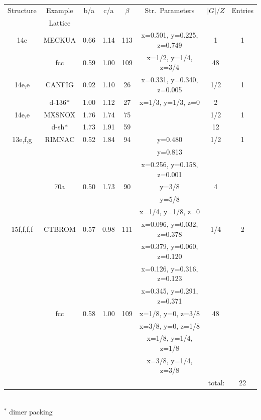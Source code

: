 \documentclass[preprint]{iucr}              %
\begin{document}
\begin{landscape}
\begin{table}
\begin{center}
\begin{tabular}{cccccccc}%
\cline{1-8}
Structure & Example & b/a & c/a & $\beta$ & Str.\ Parameters & $|G|/Z$ & Entries \\
          & Lattice \\
\cline{1-8}
14e     & MECKUA    & 0.66 & 1.14 & 113 & x=0.501, y=0.225, z=0.749 & 1 & 1 \\
        & fcc       & 0.59 & 1.00 & 109 & x=1/2, y=1/4, z=3/4       & 48 \\
14e,e   & CANFIG    & 0.92 & 1.10 & 26  & x=0.331, y=0.340, z=0.005 & 1/2 & 1 \\
        & d-136$*$  & 1.00 & 1.12 & 27  & x=1/3, y=1/3, z=0         & 2 \\
14e,e   & MXSNOX    & 1.76 & 1.74 & 75  & & 1/2 & 1 \\
        & d-sh$*$   & 1.73 & 1.91 & 59  & & 12 \\
13e,f,g & RIMNAC    & 0.52 & 1.84 &  94 & y=0.480 & 1/2 & 1 \\
        &           &      &      &     & y=0.813 \\
        &           &      &      &     & x=0.256, y=0.158, z=0.001 \\
        & 70a       & 0.50 & 1.73 &  90 & y=3/8   & 4 \\
        &           &      &      &     & y=5/8 \\
        &           &      &      &     & x=1/4, y=1/8, z=0 \\
15f,f,f,f  & CTBROM & 0.57 & 0.98 & 111 & x=0.096, y=0.032, z=0.378 & 1/4 & 2 \\
        &           &      &      &     & x=0.379, y=0.060, z=0.120  \\
        &           &      &      &     & x=0.126, y=0.316, z=0.123  \\
        &           &      &      &     & x=0.345, y=0.291, z=0.371  \\
        & fcc       & 0.58 & 1.00 & 109 & x=1/8, y=0, z=3/8          & 48 \\
        &           &      &      &     & x=3/8, y=0, z=1/8  \\
        &           &      &      &     & x=1/8, y=1/4, z=1/8  \\
        &           &      &      &     & x=3/8, y=1/4, z=3/8  \\
\cline{8-8}
\multicolumn{7}{r}{total:} & 22 \\
\cline{1-8}
\end{tabular}\\
$^*$ dimer packing
\end{center}
\end{table}
\end{landscape}
\end{document}
